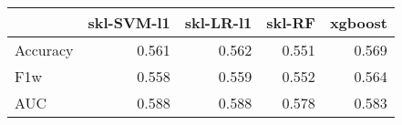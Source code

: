 \begin{tabular}{lrrrr}
\toprule
{} &  skl-SVM-l1 &  skl-LR-l1 &  skl-RF &  xgboost \\
\midrule
Accuracy &       0.561 &      0.562 &   0.551 &    0.569 \\
F1w      &       0.558 &      0.559 &   0.552 &    0.564 \\
AUC      &       0.588 &      0.588 &   0.578 &    0.583 \\
\bottomrule
\end{tabular}
